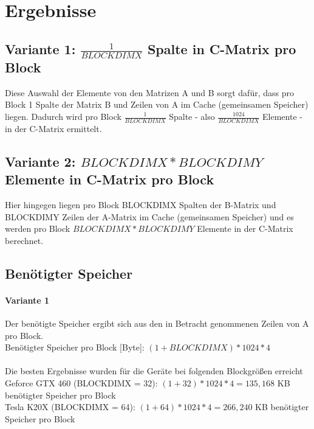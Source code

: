\section{Ergebnisse}

\subsection{Variante 1: $\frac{1}{BLOCKDIMX}$ Spalte in C-Matrix pro Block}

Diese Auswahl der Elemente von den Matrizen A und B sorgt dafür, dass pro Block 1 Spalte der Matrix B und  Zeilen von A im Cache (gemeinsamen Speicher) liegen. Dadurch wird pro Block $\frac{1}{BLOCKDIMX}$ Spalte - also $\frac{1024}{BLOCKDIMX}$ Elemente - in der C-Matrix ermittelt.
\\

\subsection{Variante 2: $BLOCKDIMX * BLOCKDIMY$ Elemente in C-Matrix pro Block}

Hier hingegen liegen pro Block BLOCKDIMX Spalten der B-Matrix und BLOCKDIMY Zeilen der A-Matrix im Cache (gemeinsamen Speicher) und es werden pro Block $BLOCKDIMX * BLOCKDIMY$ Elemente in der C-Matrix berechnet.
\\
\subsection{Benötigter Speicher}
\paragraph{Variante 1} Der benötigte Speicher ergibt sich aus den in Betracht genommenen Zeilen von A pro Block. \\
Benötigter Speicher pro Block [Byte]: $(1+BLOCKDIMX) * 1024 * 4$\\\\
Die besten Ergebnisse wurden für die Geräte bei folgenden Blockgrößen erreicht \\
Geforce GTX 460 (BLOCKDIMX = 32): $(1+32) * 1024 * 4 = 135,168$ KB benötigter Speicher pro Block \\
Tesla K20X (BLOCKDIMX = 64): $(1+64) * 1024 * 4 = 266,240$ KB benötigter Speicher pro Block 

